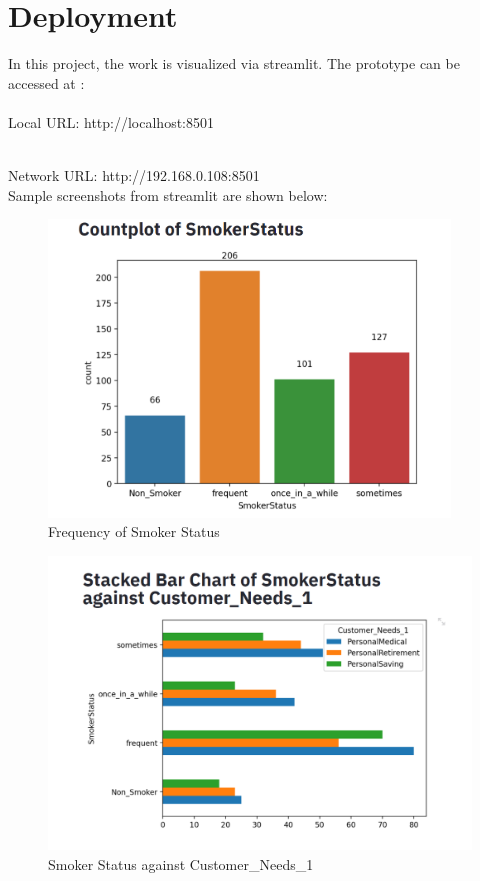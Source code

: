\documentclass[11pt]{article}
\begin{document}
\section{Deployment}

In this project, the work is visualized via streamlit. The prototype can be accessed at :\\

    \\  Local URL: http://localhost:8501\vspace{0.3cm}

    \\  Network URL: http://192.168.0.108:8501 \\

Sample screenshots from streamlit are shown below:

 \begin{figure}[H] 
     \centering
     \includegraphics[width=0.95\textwidth]{diagram1.png}
     \caption{Frequency of Smoker Status}
     \label{fig:diagram1.png}
 \end{figure}
\vspace{0.3cm}

 \begin{figure}[H] 
     \centering
     \includegraphics[width=1.00\textwidth]{diagram2.png}
     \caption{Smoker Status against Customer\_Needs\_1}
     \label{fig:diagram2.png}
 \end{figure}
\vspace{0.3cm}
\end{document}
